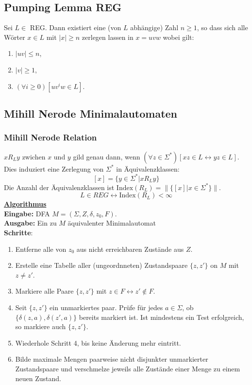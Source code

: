 \documentclass[9pt]{article}
\begin{document}
\subsection{Pumping Lemma REG}
Sei $L \in$ REG. Dann existiert eine (von $L$ abhängige) Zahl $n \geq 1$, so dass sich alle Wörter $x \in L$ mit $|x|\geq n$ zerlegen lassen in $x = uvw$ wobei gilt:
\begin{enumerate}
	\item $|uv| \leq n$,
	\item $|v| \geq 1$,
	\item $(\forall i \geq 0)[uv^iw \in L]$.
\end{enumerate}
\subsection{Mihill Nerode Minimalautomaten}
\subsubsection{Mihill Nerode Relation}
$xR_Ly$ zwichen $x$ und $y$ gild genau dann, wenn $(\forall z \in \Sigma^*)[xz\in L \leftrightarrow yz \in L]$.
Dies induziert eine Zerlegung von $\Sigma^*$ in Äquivalenzklassen: $$[x] = \{y \in \Sigma^* | xR_Ly\}$$
Die Anzahl der Äquivalenzklassen ist $\text{Index}(R_L) = \|\{[x]|x \in \Sigma^*\}\|$.
$$L\in REG \leftrightarrow \text{Index}(R_L) < \infty$$
\textbf{\underline{Algorithmus}}\\
\textbf{Eingabe:} DFA $M = (\Sigma, Z, \delta, z_0, F)$.\\
\textbf{Ausgabe:} Ein zu $M$ äquivalenter Minimalautomat\\
\textbf{Schritte}:
\begin{enumerate}
	\item Entferne alle von $z_0$ aus nicht erreichbaren Zustände aus $Z$.
	\item Erstelle eine Tabelle aller (ungeordnneten) Zustandspaare $\{z, z'\}$ on $M$ mit $z \neq z'$.
	\item Markiere alle Paare $\{z, z'\}$ mit
	$z\in F \leftrightarrow z' \notin F$.
	\item Seit $\{z, z'\}$ ein unmarkiertes paar. Prüfe für jedes $a \in \Sigma$, ob
	$\{\delta(z, a), \delta(z', a)\}$
	bereits markiert ist. Ist mindestens ein Test erfolgreich, so markiere auch $\{z, z'\}$.
	\item Wiederhole Schritt 4, bis keine Änderung mehr eintritt.
	\item Bilde maximale Mengen paarweise nicht disjunkter unmarkierter Zustandspaare und verschmelze jeweils alle Zustände einer Menge zu einem neuen Zustand.
\end{enumerate}
\end{document}
